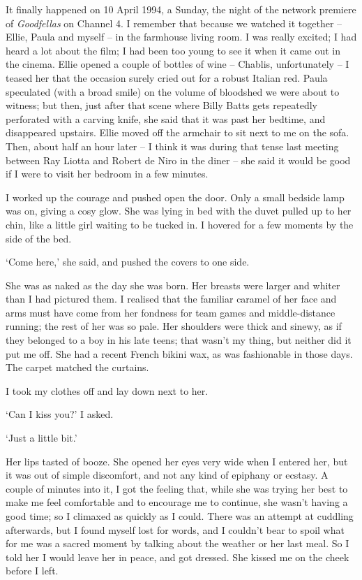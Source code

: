 It finally happened on 10 April 1994, a Sunday, the night of the network premiere of \textit{Goodfellas} on Channel 4. I remember that because we watched it together -- Ellie, Paula and myself -- in the farmhouse living room. I was really excited; I had heard a lot about the film; I had been too young to see it when it came out in the cinema. Ellie opened a couple of bottles of wine -- Chablis, unfortunately -- I teased her that the occasion surely cried out for a robust Italian red. Paula speculated (with a broad smile) on the volume of bloodshed we were about to witness; but then, just after that scene where Billy Batts gets repeatedly perforated with a carving knife, she said that it was past her bedtime, and disappeared upstairs. Ellie moved off the armchair to sit next to me on the sofa. Then, about half an hour later -- I think it was during that tense last meeting between Ray Liotta and Robert de Niro in the diner -- she said it would be good if I were to visit her bedroom in a few minutes.

I worked up the courage and pushed open the door. Only a small bedside lamp was on, giving a cosy glow. She was lying in bed with the duvet pulled up to her chin, like a little girl waiting to be tucked in. I hovered for a few moments by the side of the bed.

`Come here,' she said, and pushed the covers to one side.

She was as naked as the day she was born. Her breasts were larger and whiter than I had pictured them. I realised that the familiar caramel of her face and arms must have come from her fondness for team games and middle-distance running; the rest of her was so pale. Her shoulders were thick and sinewy, as if they belonged to a boy in his late teens; that wasn't my thing, but neither did it put me off. She had a recent French bikini wax, as was fashionable in those days. The carpet matched the curtains.

I took my clothes off and lay down next to her.

`Can I kiss you?' I asked.

`Just a little bit.'

Her lips tasted of booze. She opened her eyes very wide when I entered her, but it was out of simple discomfort, and not any kind of epiphany or ecstasy. A couple of minutes into it, I got the feeling that, while she was trying her best to make me feel comfortable and to encourage me to continue, she wasn't having a good time; so I climaxed as quickly as I could. There was an attempt at cuddling afterwards, but I found myself lost for words, and I couldn't bear to spoil what for me was a sacred moment by talking about the weather or her last meal. So I told her I would leave her in peace, and got dressed. She kissed me on the cheek before I left.

